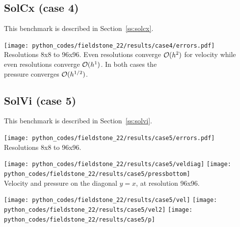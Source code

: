 \subsection*{SolCx (case 4)} 

This benchmark is described in Section~\ref{ss:solcx}.

\begin{center}
\texttt{[image: python\_codes/fieldstone\_22/results/case4/errors.pdf]}\\
{\captionfont Resolutions 8x8 to 96x96. Even resolutions converge ${\cal O}(h^2)$ 
for velocity while \\ even resolutions converge ${\cal O}(h^1)$. In both cases the \\
pressure converges ${\cal O}(h^{1/2})$.}
\end{center}


\subsection*{SolVi (case 5)} 

This benchmark is described in Section~\ref{ss:solvi}.

\begin{center}
\texttt{[image: python\_codes/fieldstone\_22/results/case5/errors.pdf]}\\
{\captionfont Resolutions 8x8 to 96x96.} 
\end{center}

\begin{center}
\texttt{[image: python\_codes/fieldstone\_22/results/case5/veldiag]}
\texttt{[image: python\_codes/fieldstone\_22/results/case5/pressbottom]}\\
{\captionfont Velocity and pressure on the diagonal $y=x$, at resolution 96x96.} 
\end{center}

\begin{center}
\texttt{[image: python\_codes/fieldstone\_22/results/case5/vel]}
\texttt{[image: python\_codes/fieldstone\_22/results/case5/vel2]}
\texttt{[image: python\_codes/fieldstone\_22/results/case5/p]}\\
\end{center}



